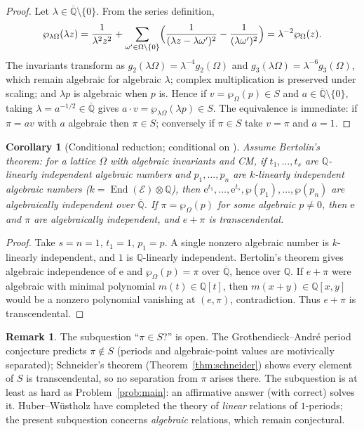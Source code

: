 \documentclass[11pt]{amsart}
\newtheorem{corollary}[theorem]{Corollary}
\theoremstyle{definition}
\newtheorem{remark}[theorem]{Remark}
\theoremstyle{remark}
\numberwithin{equation}{section}
\newcommand{\Q}{\mathbb{Q}}
\newcommand{\Qbar}{\overline{\mathbb{Q}}}
\newcommand{\ee}{\mathrm{e}}
\begin{document}
\begin{proof}
Let $\lambda\in\Qbar\setminus\{0\}$. From the series definition,
\[
\wp_{\lambda\Omega}(\lambda z)=\frac1{\lambda^2z^2}+\sum_{\omega'\in\Omega\setminus\{0\}}\Bigl(\frac1{(\lambda z-\lambda\omega')^2}-\frac1{(\lambda\omega')^2}\Bigr)=\lambda^{-2}\wp_\Omega(z).
\]
The invariants transform as $g_2(\lambda\Omega)=\lambda^{-4}g_2(\Omega)$ and $g_3(\lambda\Omega)=\lambda^{-6}g_3(\Omega)$, which remain algebraic for algebraic $\lambda$; complex multiplication is preserved under scaling; and $\lambda p$ is algebraic when $p$ is. Hence if $v=\wp_\Omega(p)\in S$ and $a\in\Qbar\setminus\{0\}$, taking $\lambda=a^{-1/2}\in\Qbar$ gives $a\cdot v=\wp_{\lambda\Omega}(\lambda p)\in S$. The equivalence is immediate: if $\pi=a v$ with $a$ algebraic then $\pi\in S$; conversely if $\pi\in S$ take $v=\pi$ and $a=1$.
\end{proof}

\begin{corollary}[Conditional reduction; conditional on {\cite{Bertolin2026}}]\label{cor:bertolin}
Assume Bertolin's theorem: for a lattice $\Omega$ with algebraic invariants and CM, if $t_1,\dots,t_s$ are $\Q$-linearly independent algebraic numbers and $p_1,\dots,p_n$ are $k$-linearly independent algebraic numbers ($k=\operatorname{End}(\mathcal E)\otimes\Q$), then $\ee^{t_1},\dots,\ee^{t_s},\wp(p_1),\dots,\wp(p_n)$ are algebraically independent over $\Qbar$. If $\pi=\wp_\Omega(p)$ for some algebraic $p\ne0$, then $\ee$ and $\pi$ are algebraically independent, and $e+\pi$ is transcendental.
\end{corollary}

\begin{proof}
Take $s=n=1$, $t_1=1$, $p_1=p$. A single nonzero algebraic number is $k$-linearly independent, and $1$ is $\Q$-linearly independent. Bertolin's theorem gives algebraic independence of $\ee$ and $\wp_\Omega(p)=\pi$ over $\Qbar$, hence over $\Q$. If $e+\pi$ were algebraic with minimal polynomial $m(t)\in\Q[t]$, then $m(x+y)\in\Q[x,y]$ would be a nonzero polynomial vanishing at $(e,\pi)$, contradiction. Thus $e+\pi$ is transcendental.
\end{proof}

\begin{remark}
The subquestion ``$\pi\in S$?'' is open. The Grothendieck--André period conjecture predicts $\pi\notin S$ (periods and algebraic-point values are motivically separated); Schneider's theorem (Theorem~\ref{thm:schneider}) shows every element of $S$ is transcendental, so no separation from $\pi$ arises there. The subquestion is at least as hard as Problem~\ref{prob:main}: an affirmative answer (with \cite{Bertolin2026} correct) solves it. Huber--W\"ustholz \cite{HuberWustholz2022} have completed the theory of \emph{linear} relations of $1$-periods; the present subquestion concerns \emph{algebraic} relations, which remain conjectural.
\end{remark}
\end{document}
